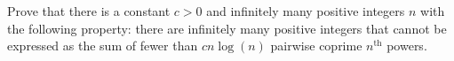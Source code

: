 Prove that there is a constant $c>0$ and infinitely many positive integers $n$ with the following property: there are infinitely many positive integers that cannot be expressed as the sum of fewer than $cn\log(n)$ pairwise coprime $n^{\text{th}}$ powers.
